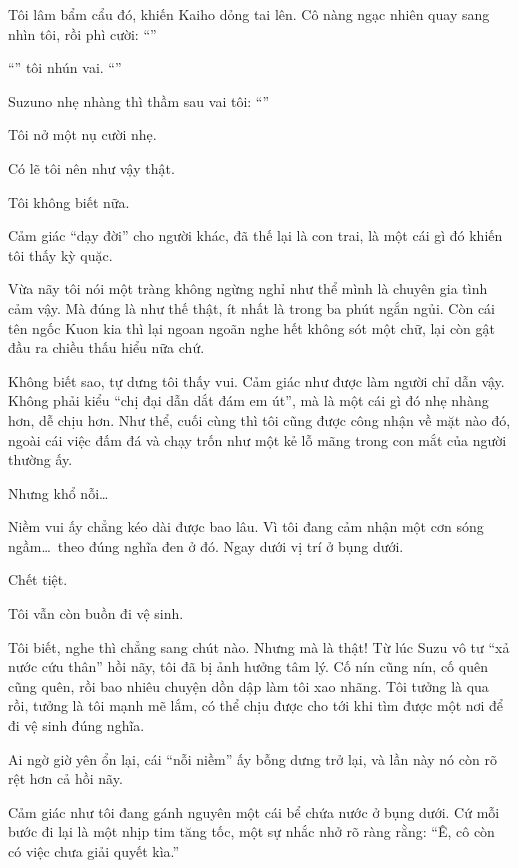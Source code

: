 \documentclass[../main.tex]{subfiles}
\begin{document}
Tôi lâm bẩm cẩu đó, khiến Kaiho dỏng tai lên. Cô nàng ngạc nhiên quay sang nhìn tôi, rồi phì cười: ``''

``'' tôi nhún vai. ``''

Suzuno nhẹ nhàng thì thầm sau vai tôi: ``''

Tôi nở một nụ cười nhẹ.

Có lẽ tôi nên như vậy thật.


Tôi không biết nữa.

Cảm giác ``dạy đời'' cho người khác, đã thế lại là con trai, là một cái gì đó khiến tôi thấy kỳ quặc.

Vừa nãy tôi nói một tràng không ngừng nghỉ như thể mình là chuyên gia tình cảm vậy. Mà đúng là như thế thật, ít nhất là trong ba phút ngắn ngủi. Còn cái tên ngốc Kuon kia thì lại ngoan ngoãn nghe hết không sót một chữ, lại còn gật đầu ra chiều thấu hiểu nữa chứ.

Không biết sao, tự dưng tôi thấy vui. Cảm giác như được làm người chỉ dẫn vậy. Không phải kiểu ``chị đại dẫn dắt đám em út'', mà là một cái gì đó nhẹ nhàng hơn, dễ chịu hơn. Như thể, cuối cùng thì tôi cũng được công nhận về mặt nào đó, ngoài cái việc đấm đá và chạy trốn như một kẻ lỗ mãng trong con mắt của người thường ấy.

\il

Nhưng khổ nỗi\dots

Niềm vui ấy chẳng kéo dài được bao lâu. Vì tôi đang cảm nhận một cơn sóng ngầm\dots\ theo đúng nghĩa đen ở đó. Ngay dưới vị trí ở bụng dưới.

Chết tiệt.

Tôi vẫn còn buồn đi vệ sinh.

Tôi biết, nghe thì chẳng sang chút nào. Nhưng mà là thật! Từ lúc Suzu vô tư ``xả nước cứu thân'' hồi nãy, tôi đã bị ảnh hưởng tâm lý. Cố nín cũng nín, cố quên cũng quên, rồi bao nhiêu chuyện dồn dập làm tôi xao nhãng. Tôi tưởng là qua rồi, tưởng là tôi mạnh mẽ lắm, có thể chịu được cho tới khi tìm được một nơi để đi vệ sinh đúng nghĩa.

Ai ngờ giờ yên ổn lại, cái ``nỗi niềm'' ấy bỗng dưng trở lại, và lần này nó còn rõ rệt hơn cả hồi nãy.

Cảm giác như tôi đang gánh nguyên một cái bể chứa nước ở bụng dưới. Cứ mỗi bước đi lại là một nhịp tim tăng tốc, một sự nhắc nhở rõ ràng rằng: ``Ê, cô còn có việc chưa giải quyết kìa.''
\end{document}
